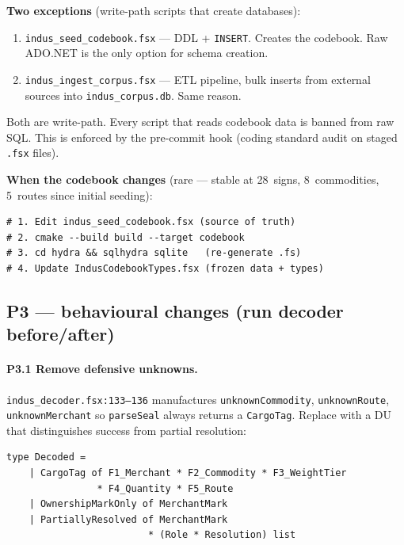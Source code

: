 \documentclass[11pt]{article}
\begin{document}
\textbf{Two exceptions} (write-path scripts that create databases):

\begin{enumerate}[nosep]
\item \texttt{indus\_seed\_codebook.fsx} --- DDL +
  \texttt{INSERT}.  Creates the codebook.  Raw ADO.NET is the
  only option for schema creation.
\item \texttt{indus\_ingest\_corpus.fsx} --- ETL pipeline, bulk
  inserts from external sources into \texttt{indus\_corpus.db}.
  Same reason.
\end{enumerate}

\noindent
Both are write-path.  Every script that reads codebook data is
banned from raw SQL.  This is enforced by the pre-commit hook
(coding standard audit on staged \texttt{.fsx} files).

\textbf{When the codebook changes} (rare --- stable at 28~signs,
8~commodities, 5~routes since initial seeding):

\begin{Verbatim}[fontsize=\small,frame=single]
# 1. Edit indus_seed_codebook.fsx (source of truth)
# 2. cmake --build build --target codebook
# 3. cd hydra && sqlhydra sqlite   (re-generate .fs)
# 4. Update IndusCodebookTypes.fsx (frozen data + types)
\end{Verbatim}

\subsection{P3 --- behavioural changes (run decoder before/after)}

\paragraph{P3.1 Remove defensive unknowns.}
\texttt{indus\_decoder.fsx:133--136} manufactures
\texttt{unknownCommodity}, \texttt{unknownRoute},
\texttt{unknownMerchant} so \texttt{parseSeal} always returns a
\texttt{CargoTag}.  Replace with a DU that distinguishes success
from partial resolution:

\begin{Verbatim}[fontsize=\small,frame=single]
type Decoded =
    | CargoTag of F1_Merchant * F2_Commodity * F3_WeightTier
                * F4_Quantity * F5_Route
    | OwnershipMarkOnly of MerchantMark
    | PartiallyResolved of MerchantMark
                         * (Role * Resolution) list
\end{Verbatim}
\end{document}
